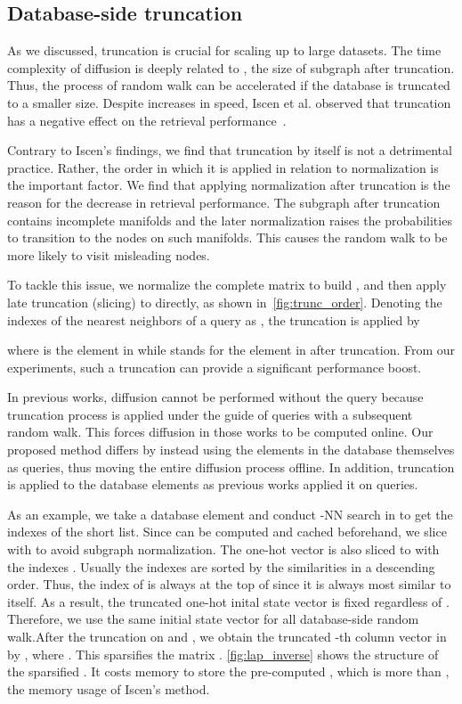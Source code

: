 \documentclass[letterpaper]{article} \usepackage{aaai19}  \usepackage{times}  \usepackage{helvet}  \usepackage{courier}  \usepackage{url}  \usepackage{graphicx}  \frenchspacing  \setlength{\pdfpagewidth}{8.5in}  \setlength{\pdfpageheight}{11in}
\begin{document}
\subsection{Database-side truncation}

As we discussed, truncation is crucial for scaling up to large datasets.
The time complexity of diffusion is deeply related to , the size of subgraph after truncation.
Thus, the process of random walk can be accelerated if the database is truncated to a smaller size.
Despite increases in speed, Iscen et al. observed that truncation has a negative effect on the retrieval performance~\cite{iscen2017efficient}.



Contrary to Iscen's findings, we find that truncation by itself is not a detrimental practice.
Rather, the order in which it is applied in relation to normalization is the important factor.
We find that applying normalization after truncation is the reason for the decrease in retrieval performance.
The subgraph after truncation contains incomplete manifolds and the later normalization raises the probabilities to transition to the nodes on such manifolds.
This causes the random walk to be more likely to visit misleading nodes.


To tackle this issue, we normalize the complete matrix  to build , and then apply late truncation (slicing) to  directly, as shown in~\cref{fig:trunc_order}.
Denoting the indexes of the nearest neighbors of a query as , the truncation is applied by

where  is the element in  while  stands for the element in  after truncation.
From our experiments, such a truncation can provide a significant performance boost.




In previous works, diffusion cannot be performed without the query because truncation process is applied under the guide of queries with a subsequent random walk.
This forces diffusion in those works to be computed online.
Our proposed method differs by instead using the elements in the database themselves as queries, thus moving the entire diffusion process offline.
In addition, truncation is applied to the database elements as previous works applied it on queries.

As an example, we take a database element  and conduct -NN search in  to get the indexes  of the short list.
Since  can be computed and cached beforehand, we slice  with  to avoid subgraph normalization.
The one-hot vector  is also sliced to  with the indexes .
Usually the indexes  are sorted by the similarities in a descending order.
Thus, the index  of  is always at the top of  since it is always most similar to itself.
As a result, the truncated one-hot inital state vector  is fixed regardless of .
Therefore, we use the same initial state vector for all database-side random walk.After the truncation on  and , we obtain the truncated -th column vector in  by , where .
This sparsifies the matrix .
\cref{fig:lap_inverse} shows the structure of the sparsified .
It costs  memory to store the pre-computed , which is more than , the memory usage of Iscen's method.
\end{document}
